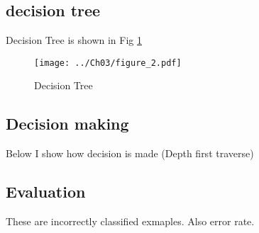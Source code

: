 \documentclass[hw3.tex]{subfiles}
\begin{document}
\subsection{decision tree}
Decision Tree is shown in Fig \ref{fig:dtree}\\
\begin{figure}[h]
 \centering
 \texttt{[image: ../Ch03/figure\_2.pdf]}
 \caption{Decision Tree}
 \label{fig:dtree}
\end{figure}
\subsection{Decision making}
Below I show how decision is made (Depth first traverse)\\

\subsection{Evaluation}
These are incorrectly classified exmaples. Also error rate.

\end{document}
